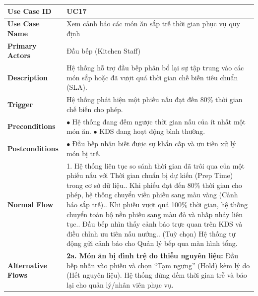 \begin{longtable}{|L{3.5cm}|L{12.5cm}|}
\hline
\textbf{Use Case ID} & UC17 \\ \hline
\textbf{Use Case Name} & Xem cảnh báo các món ăn sắp trễ thời gian phục vụ quy định \\ \hline
\textbf{Primary Actors} & Đầu bếp (Kitchen Staff) \\ \hline
\textbf{Description} & Hệ thống hỗ trợ đầu bếp phân bổ lại sự tập trung vào các món sắp hoặc đã vượt quá thời gian chế biến tiêu chuẩn (SLA). \\ \hline
\textbf{Trigger} & Hệ thống phát hiện một phiếu nấu đạt đến 80\% thời gian chế biến cho phép. \\ \hline
\textbf{Preconditions} &
$\bullet$ Hệ thống đang đếm ngược thời gian nấu của ít nhất một món ăn.\newline
$\bullet$ KDS đang hoạt động bình thường. \\ \hline
\textbf{Postconditions} & $\bullet$ Đầu bếp nhận biết được sự khẩn cấp và ưu tiên xử lý món bị trễ. \\ \hline
\textbf{Normal Flow} &
1. Hệ thống liên tục so sánh thời gian đã trôi qua của một phiếu nấu với Thời gian chuẩn bị dự kiến (Prep Time) trong cơ sở dữ liệu.. Khi phiếu đạt đến 80\% thời gian cho phép, hệ thống chuyển viền phiếu sang màu vàng (Cảnh báo sắp trễ).. Khi phiếu vượt quá 100\% thời gian, hệ thống chuyển toàn bộ nền phiếu sang màu đỏ và nhấp nháy liên tục.. Đầu bếp nhìn thấy cảnh báo trực quan trên KDS và điều chỉnh ưu tiên nấu nướng.. (Tuỳ chọn) Hệ thống tự động gửi cảnh báo cho Quản lý bếp qua màn hình tổng. \\ \hline
\textbf{Alternative Flows} &
\textbf{2a. Món ăn bị đình trệ do thiếu nguyên liệu:} Đầu bếp nhấn vào phiếu và chọn ``Tạm ngưng'' (Hold) kèm lý do (Hết nguyên liệu). Hệ thống dừng đếm thời gian trễ và báo lại cho quản lý/nhân viên phục vụ. \\ \hline
\end{longtable}

